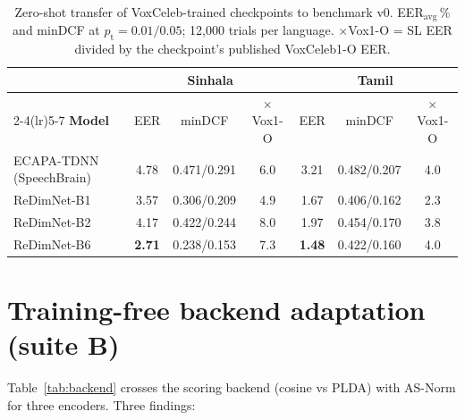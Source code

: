 \begin{table}[t]
\centering
\caption{Zero-shot transfer of VoxCeleb-trained checkpoints to
benchmark v0. EER$_{\mathrm{avg}}$\,\% and minDCF at
$p_{\mathrm{t}}{=}0.01/0.05$; 12{,}000 trials per language.
$\times$Vox1-O = SL EER divided by the checkpoint's published
VoxCeleb1-O EER.}
\label{tab:zeroshot}
\begin{tabular}{lcccccc}
\toprule
& \multicolumn{3}{c}{\textbf{Sinhala}} & \multicolumn{3}{c}{\textbf{Tamil}} \\
\cmidrule(lr){2-4}\cmidrule(lr){5-7}
\textbf{Model} & EER & minDCF & $\times$Vox1-O & EER & minDCF & $\times$Vox1-O \\
\midrule
ECAPA-TDNN (SpeechBrain) & 4.78 & 0.471/0.291 & 6.0 & 3.21 & 0.482/0.207 & 4.0 \\
ReDimNet-B1              & 3.57 & 0.306/0.209 & 4.9 & 1.67 & 0.406/0.162 & 2.3 \\
ReDimNet-B2              & 4.17 & 0.422/0.244 & 8.0 & 1.97 & 0.454/0.170 & 3.8 \\
ReDimNet-B6              & \textbf{2.71} & 0.238/0.153 & 7.3 & \textbf{1.48} & 0.422/0.160 & 4.0 \\
\bottomrule
\end{tabular}
\end{table}

\section{Training-free backend adaptation (suite B)}
\label{sec:backend-results}

Table~\ref{tab:backend} crosses the scoring backend (cosine vs PLDA)
with AS-Norm for three encoders. Three findings:

